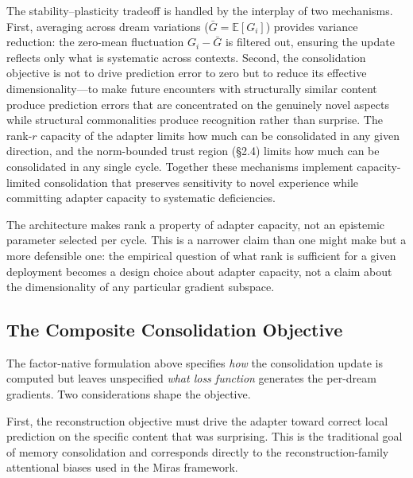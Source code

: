 \documentclass[11pt]{article}
\newcommand{\E}{\mathbb{E}}
\begin{document}
The stability--plasticity tradeoff is handled by the interplay of two mechanisms. First, averaging across dream variations ($\bar{G} = \E[G_i]$) provides variance reduction: the zero-mean fluctuation $G_i - \bar{G}$ is filtered out, ensuring the update reflects only what is systematic across contexts. Second, the consolidation objective is not to drive prediction error to zero but to reduce its effective dimensionality---to make future encounters with structurally similar content produce prediction errors that are concentrated on the genuinely novel aspects while structural commonalities produce recognition rather than surprise. The rank-$r$ capacity of the adapter limits how much can be consolidated in any given direction, and the norm-bounded trust region (\S 2.4) limits how much can be consolidated in any single cycle. Together these mechanisms implement capacity-limited consolidation that preserves sensitivity to novel experience while committing adapter capacity to systematic deficiencies.

The architecture makes rank a property of adapter capacity, not an epistemic parameter selected per cycle. This is a narrower claim than one might make but a more defensible one: the empirical question of what rank is sufficient for a given deployment becomes a design choice about adapter capacity, not a claim about the dimensionality of any particular gradient subspace.

\subsection{The Composite Consolidation Objective}

The factor-native formulation above specifies \emph{how} the consolidation update is computed but leaves unspecified \emph{what loss function} generates the per-dream gradients. Two considerations shape the objective.

First, the reconstruction objective must drive the adapter toward correct local prediction on the specific content that was surprising. This is the traditional goal of memory consolidation and corresponds directly to the reconstruction-family attentional biases used in the Miras framework.
\end{document}
